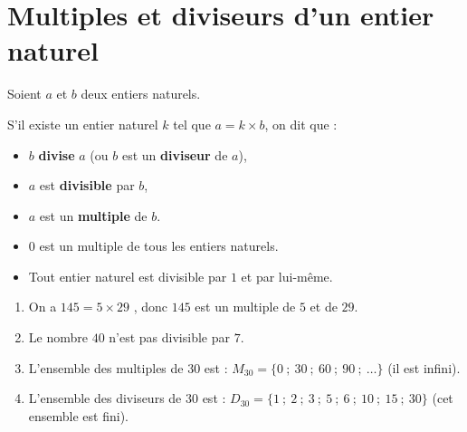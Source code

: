 \documentclass[10pt, a4paper]{article}
\begin{document}
\section{Multiples et diviseurs d'un entier naturel }

\begin{Definition}
Soient $a$ et $b$ deux entiers naturels.

S'il existe un entier naturel $k$ tel que $a = k \times b$, on dit que :
\begin{itemize}[leftmargin=*,itemsep=0.5pt]
  \item $b$ \textbf{divise} $a$ (ou $b$ est un \textbf{diviseur} de $a$),
  \item $a$ est \textbf{divisible} par $b$,
  \item $a$ est un \textbf{multiple} de $b$.
\end{itemize}
\end{Definition}

\begin{Remarque}
\begin{itemize}[leftmargin=*,itemsep=0.5pt]
  \item $0$ est un multiple de tous les entiers naturels.
  \item Tout entier naturel est divisible par $1$ et par lui-même.
\end{itemize}
\end{Remarque}

\begin{Exemple}[][5 min]
\begin{enumerate}[leftmargin=*,itemsep=0.5pt]
    \item On a $145 = 5 \times 29$ , donc $145$ est un multiple de $5$ et de $29$.
    
    \item Le nombre $40$ n'est pas divisible par $7$.
    
    \item L'ensemble des multiples de $30$ est : 
    $M_{30} = \big\{ 0 ~;~ 30 ~;~ 60 ~;~ 90 ~;~ \dots \big\}$ (il est infini).
    
    \item L'ensemble des diviseurs de $30$ est : $D_{30} = \big\{1~;~2~;~3~;~5~;~6~;~10~;~15~;~30\big\}$ (cet ensemble est fini).
\end{enumerate}
\end{Exemple}
\end{document}
